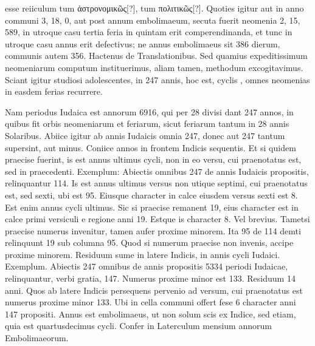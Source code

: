  esse reiiculum tum \textgreek{ἀστρονομικῶς[?]}, tum
\textgreek{πολιτικῶς[?]}.
Quoties igitur aut in anno communi 3, 18, 0, aut post annum
embolimaeum, secuta fuerit neomenia 2, 15, 589, in utroque casu
tertia feria in quintam erit comperendinanda, et tunc in utroque
casu annus erit defectivus; ne annus embolimaeus %
 sit 386 dierum, communis
autem 356.
Hactenus de Translationibus.
Sed quamius expeditissimum
neomeniarum computum
instituerimus, aliam
tamen, methodum
excogitavimus.
Sciant %
igitur studiosi adolescentes,
in 247 annis,
hoc est, cyclis
, omnes neomenias
in easdem ferias
recurrere.
\begin{table}[t]
  
\end{table}
Nam periodus
Iudaica est annorum 6916, qui
per 28 divisi dant
247 annos, in quibus
fit orbis neomeniarum
et feriarum,
sicut feriarum tantum
in 28 annis Solaribus.
%
%
%
Abiice igitur ab annis Iudaicis omnia 247, donec aut 247
tantum supersint, aut minus.
Coniice annos in frontem Indicis sequentis.
Et si quidem praecise fuerint, is est annus ultimus cycli, non in eo
versu, cui praenotatus est, sed in praecedenti.
Exemplum: Abiectis omnibus
247 de annis Iudaicis propositis, relinquantur 114.
Is est annus
ultimus versus non utique septimi, cui praenotatus est, sed sexti, ubi
est 95.
Eiusque character in calce eiusdem versus sexti est 8.
Est enim
annus cycli ultimus.
Sic si praecise remanent 19, eius character est in
calce primi versiculi e regione anni 19.
Estque is character 8.
Vel
brevius.
Tametsi praecise numerus invenitur, tamen aufer proxime
minorem.
Ita 95 de 114 demti relinquunt 19 sub columna 95.
Quod
si numerum praecise non invenis, accipe proxime minorem.
Residuum
sume in latere Indicis, in annis cycli Iudaici.
Exemplum.
Abiectis
247 omnibus de annis propositis 5334 periodi Iudaicae, relinquantur,
verbi gratia, 147.
Numerus proxime minor est 133.
Residuum
14 anni.
Quos ab %
latere Indicis persequens pervenio ad versum, cui
praenotatus est numerus proxime minor 133.
Ubi in cella communi
offert fese 6 character anni 147 propositi.
Annus est embolimaeus,
ut non solum scis ex Indice, sed etiam, quia est quartusdecimus
cycli.
Confer in Laterculum mensium annorum Embolimaeorum.
